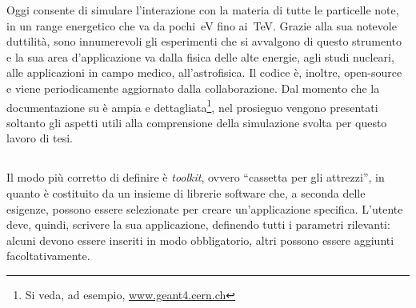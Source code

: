 Oggi \geant{} consente di simulare l'interazione con la materia di tutte le particelle note, in un range energetico che va da pochi~eV fino ai~TeV.
%
Grazie alla sua notevole duttilità, sono innumerevoli gli esperimenti che si avvalgono di questo strumento e la sua area d'applicazione va dalla fisica delle alte energie, agli studi nucleari, alle applicazioni in campo medico, all'astrofisica.
Il codice è, inoltre, open-source e viene periodicamente aggiornato dalla collaborazione. 
Dal momento che la documentazione su \geant{} è ampia e dettagliata\footnote{Si veda, ad esempio, \url{www.geant4.cern.ch}}, nel prosieguo vengono presentati soltanto gli aspetti utili alla comprensione della simulazione svolta per questo lavoro di tesi.  




\subsection{}

Il modo più corretto di definire \geant{} è \emph{toolkit}, ovvero ``cassetta per gli attrezzi'', in quanto è costituito da un insieme di librerie software che, a seconda delle esigenze, possono essere selezionate per creare un'applicazione specifica.
L'utente deve, quindi, scrivere la sua applicazione, definendo tutti i parametri rilevanti: alcuni devono essere inseriti in modo obbligatorio, altri possono essere aggiunti facoltativamente.

